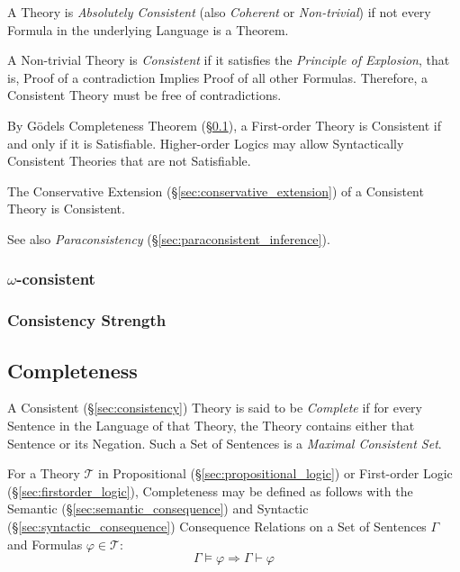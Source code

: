 A Theory is \emph{Absolutely Consistent} (also \emph{Coherent} or
\emph{Non-trivial}) if not every Formula in the underlying Language is
a Theorem.

A Non-trivial Theory is \emph{Consistent} if it satisfies the
\emph{Principle of Explosion}, that is, Proof of a contradiction
Implies Proof of all other Formulas. Therefore, a Consistent Theory must
be free of contradictions.

By G\"odels Completeness Theorem (\S\ref{sec:completeness}), a
First-order Theory is Consistent if and only if it is Satisfiable.
Higher-order Logics may allow Syntactically Consistent Theories that
are not Satisfiable.

The Conservative Extension (\S\ref{sec:conservative_extension}) of a
Consistent Theory is Consistent.

See also \emph{Paraconsistency} (\S\ref{sec:paraconsistent_inference}).



\subsubsection{$\omega$-consistent}\label{sec:omega_consistent}

\subsubsection{Consistency Strength}\label{sec:consistency_strength}



\subsection{Completeness}\label{sec:completeness}

A Consistent (\S\ref{sec:consistency}) Theory is said to be
\emph{Complete} if for every Sentence in the Language of that Theory,
the Theory contains either that Sentence or its Negation. Such a Set
of Sentences is a \emph{Maximal Consistent Set}.

For a Theory $\mathcal{T}$ in Propositional
(\S\ref{sec:propositional_logic}) or First-order Logic
(\S\ref{sec:firstorder_logic}), Completeness may be defined as follows
with the Semantic (\S\ref{sec:semantic_consequence}) and Syntactic
(\S\ref{sec:syntactic_consequence}) Consequence Relations on a Set of
Sentences $\Gamma$ and Formulas $\varphi \in \mathcal{T}$:
\[
  \Gamma \vDash \varphi \Rightarrow \Gamma \vdash \varphi
\]

